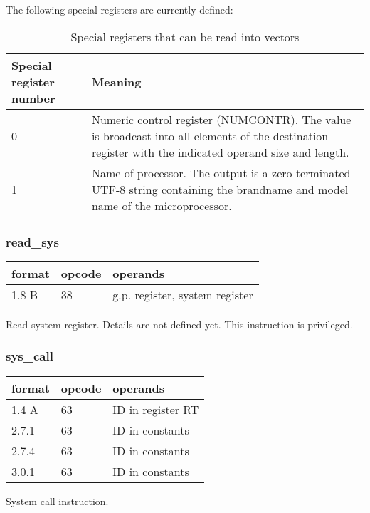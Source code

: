 \documentclass[forwardcom.tex]{subfiles}
\begin{document}
The following special registers are currently defined:

\begin{longtable} {|p{15mm}|p{100mm}|}
\caption{Special registers that can be read into vectors} 
\label{table:specialVectorRegisters} \\
\endfirsthead
\endhead
\hline
\bfseries Special register number & \bfseries Meaning  \\
\hline
0 & Numeric control register (NUMCONTR). The value is broadcast into all elements of the destination register with the indicated operand size and length.  \\
\hline
1 & Name of processor. The output is a zero-terminated UTF-8 string containing the brandname and model name of the microprocessor. \\
\hline
\end{longtable}


\subsubsection{read\_sys}
\label{table:readSysInstruction}
\begin{tabular}{|p{12mm}|p{12mm}|p{110mm}|}
\hline
\bfseries format & \bfseries opcode & \bfseries operands \\ \hline
1.8 B & 38 & g.p. register, system register \\ \hline
\end{tabular}
\vspace{2mm}

Read system register. Details are not defined yet. This instruction is privileged.

\subsubsection{sys\_call}
\label{table:sysCallInstruction}
\begin{tabular}{|p{12mm}|p{12mm}|p{110mm}|}
\hline
\bfseries format & \bfseries opcode & \bfseries operands \\ \hline
1.4 A & 63 & ID in register RT \\ \hline
2.7.1 & 63 & ID in constants \\ \hline
2.7.4 & 63 & ID in constants \\ \hline
3.0.1 & 63 & ID in constants \\ \hline
\end{tabular}
\vspace{2mm}

System call instruction.
\end{document}
